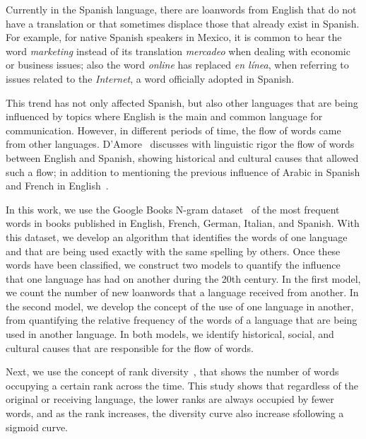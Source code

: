 \documentclass[10pt,letterpaper]{article} %
\begin{document}

Currently in the Spanish language, there are loanwords from English 
that do not have a translation or that sometimes displace those that already
exist in Spanish.  For example, for native Spanish speakers in Mexico, it is common to
hear the word \textit{marketing} instead of its translation \textit{mercadeo}
when dealing with economic or business issues; also the word \textit{online}
has replaced \textit{en línea}, when referring to issues related to the
\textit{Internet}, a word officially adopted in Spanish.

This trend has not only affected Spanish,  but also other languages that are
being influenced by topics where English is the main and common language for
communication. However, in different periods of time, the flow of words came
from other languages. D’Amore~\cite{Damore_influencia_mutua} discusses with linguistic rigor the
flow of words between English and Spanish,  showing historical  and cultural
causes that allowed such a flow; in addition to mentioning the previous influence of
Arabic in Spanish and French in
English~\cite{gorlach2005dictionary,haspelmath2009loanwords,durkin2014borrowed}. 

In this work, we use the Google Books N-gram dataset~\cite{ngramv} of the most
frequent words in books published in English, French, German, Italian, and
Spanish. With this dataset,  we develop an algorithm that identifies
the words of one language and that are being used exactly with the same 
spelling by others. Once these words
have been classified, we construct two models to quantify the influence that
one language has had on another during the 20th century. In the first model, we
count the number of new loanwords that a language received from another. In
the second model, we develop the concept of the use of one language in
another, from quantifying the relative frequency of  the words of a language
that are being used in another language. In both models, we identify historical, social,
and cultural causes that are responsible for the flow of words.

Next, we use the concept of rank diversity~\cite{iplosone},  that shows the number of words
occupying a certain rank across the time. This study shows that  regardless of
the original or receiving language,  the lower ranks are always occupied by
fewer words, and as the rank increases, the diversity curve also increase
sfollowing a sigmoid curve. %
\end{document}
